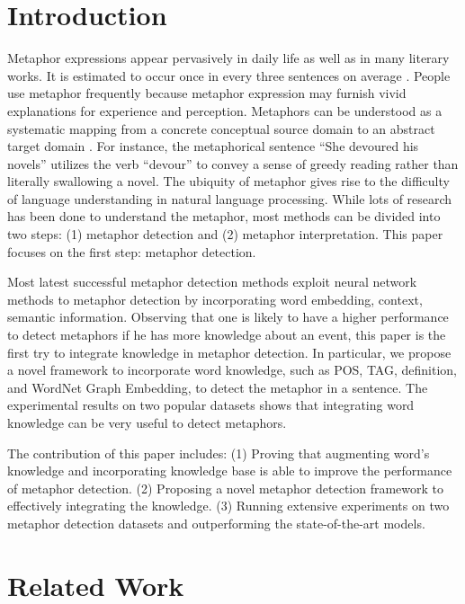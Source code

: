 \documentclass[11pt,a4paper]{article}
\begin{document}
\section{Introduction}

Metaphor expressions appear pervasively in daily life as well as in many literary works. It is estimated to occur once in every three sentences on average \cite{bilsky1952ia}. People use metaphor frequently because metaphor expression may furnish vivid explanations for experience and perception. Metaphors can be understood as a systematic mapping from a concrete conceptual source domain to an abstract target domain \cite{1982Lakoff}. For instance, the metaphorical sentence “She devoured his novels” utilizes the verb “devour” to convey a sense of greedy reading rather than literally swallowing a novel. The ubiquity of metaphor gives rise to the difficulty of language understanding in natural language processing. While lots of research has been done to understand the metaphor, most methods can be divided into two steps: (1) metaphor detection and (2) metaphor interpretation. This paper focuses on the first step: metaphor detection. 

Most latest successful metaphor detection methods exploit neural network methods to metaphor detection by incorporating word embedding, context, semantic information. Observing that one is likely to have a higher performance to detect metaphors if he has more knowledge about an event, this paper is the first try to integrate knowledge in metaphor detection. In particular, we propose a novel framework to incorporate word knowledge, such as POS, TAG, definition, and WordNet Graph Embedding, to detect the metaphor in a sentence. The experimental results on two popular datasets shows that integrating word knowledge can be very useful to detect metaphors.

The contribution of this paper includes: (1) Proving that augmenting word’s knowledge and incorporating knowledge base is able to improve the performance of metaphor detection. (2) Proposing a novel metaphor detection framework to effectively integrating the knowledge. (3) Running extensive experiments on two metaphor detection datasets and outperforming the state-of-the-art models.



\section{Related Work}
\end{document}
